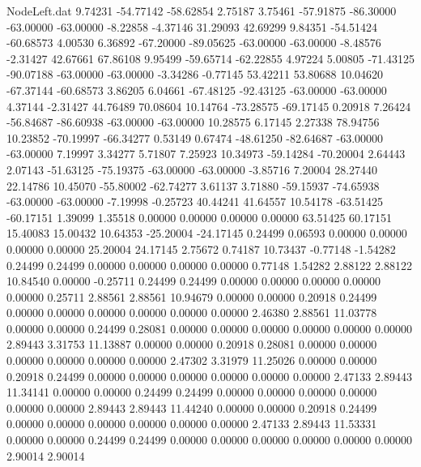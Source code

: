 \begin{filecontents}{NodeLeft.dat}
   9.74231  -54.77142  -58.62854     2.75187    3.75461  -57.91875  -86.30000  -63.00000  -63.00000   -8.22858   -4.37146   31.29093   42.69299
   9.84351  -54.51424  -60.68573     4.00530    6.36892  -67.20000  -89.05625  -63.00000  -63.00000   -8.48576   -2.31427   42.67661   67.86108
   9.95499  -59.65714  -62.22855     4.97224    5.00805  -71.43125  -90.07188  -63.00000  -63.00000   -3.34286   -0.77145   53.42211   53.80688
  10.04620  -67.37144  -60.68573     3.86205    6.04661  -67.48125  -92.43125  -63.00000  -63.00000    4.37144   -2.31427   44.76489   70.08604
  10.14764  -73.28575  -69.17145     0.20918    7.26424  -56.84687  -86.60938  -63.00000  -63.00000   10.28575    6.17145    2.27338   78.94756
  10.23852  -70.19997  -66.34277     0.53149    0.67474  -48.61250  -82.64687  -63.00000  -63.00000    7.19997    3.34277    5.71807    7.25923
  10.34973  -59.14284  -70.20004     2.64443    2.07143  -51.63125  -75.19375  -63.00000  -63.00000   -3.85716    7.20004   28.27440   22.14786
  10.45070  -55.80002  -62.74277     3.61137    3.71880  -59.15937  -74.65938  -63.00000  -63.00000   -7.19998   -0.25723   40.44241   41.64557
  10.54178  -63.51425  -60.17151     1.39099    1.35518    0.00000    0.00000    0.00000    0.00000   63.51425   60.17151   15.40083   15.00432
  10.64353  -25.20004  -24.17145     0.24499    0.06593    0.00000    0.00000    0.00000    0.00000   25.20004   24.17145    2.75672    0.74187
  10.73437   -0.77148   -1.54282     0.24499    0.24499    0.00000    0.00000    0.00000    0.00000    0.77148    1.54282    2.88122    2.88122
  10.84540    0.00000   -0.25711     0.24499    0.24499    0.00000    0.00000    0.00000    0.00000    0.00000    0.25711    2.88561    2.88561
  10.94679    0.00000    0.00000     0.20918    0.24499    0.00000    0.00000    0.00000    0.00000    0.00000    0.00000    2.46380    2.88561
  11.03778    0.00000    0.00000     0.24499    0.28081    0.00000    0.00000    0.00000    0.00000    0.00000    0.00000    2.89443    3.31753
  11.13887    0.00000    0.00000     0.20918    0.28081    0.00000    0.00000    0.00000    0.00000    0.00000    0.00000    2.47302    3.31979
  11.25026    0.00000    0.00000     0.20918    0.24499    0.00000    0.00000    0.00000    0.00000    0.00000    0.00000    2.47133    2.89443
  11.34141    0.00000    0.00000     0.24499    0.24499    0.00000    0.00000    0.00000    0.00000    0.00000    0.00000    2.89443    2.89443
  11.44240    0.00000    0.00000     0.20918    0.24499    0.00000    0.00000    0.00000    0.00000    0.00000    0.00000    2.47133    2.89443
  11.53331    0.00000    0.00000     0.24499    0.24499    0.00000    0.00000    0.00000    0.00000    0.00000    0.00000    2.90014    2.90014

\end{filecontents}
